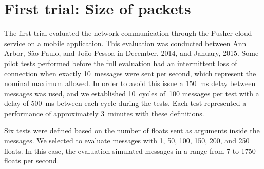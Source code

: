 



\section{First trial: Size of packets}
\label{sec:firsttrial}


The first trial evaluated the network communication through the Pusher cloud service on a mobile application.
This evaluation was conducted between Ann Arbor, São Paulo, and João Pessoa in December, 2014, and January, 2015.
Some pilot tests performed before the full evaluation had an intermittent loss of connection when exactly 10~messages were sent per second, which represent the nominal maximum allowed.
In order to avoid this issue a 150~ms delay between messages was used, and we established 10~cycles of~100 messages per test with a delay of 500~ms between each cycle during the tests.
Each test represented a performance of approximately 3~minutes with these definitions.

Six tests were defined based on the number of floats sent as arguments inside the messages.
We selected to evaluate messages with 1, 50, 100, 150, 200, and 250 floats.
In this case, the evaluation simulated messages in a range from 7 to 1750 floats per second.

